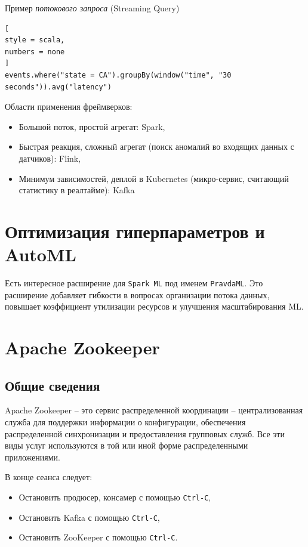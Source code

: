 \documentclass[%
	11pt,
	a4paper,
	utf8,
		]{article}
\begin{document}
Пример \emph{потокового запроса} (Streaming Query)
\begin{lstlisting}[
style = scala,
numbers = none	
]
events.where("state = CA").groupBy(window("time", "30 seconds")).avg("latency")
\end{lstlisting}

Области применения фреймверков:
\begin{itemize}
	\item Большой поток, простой агрегат: Spark,
	
	\item Быстрая реакция, сложный агрегат (поиск аномалий во входящих данных с датчиков): Flink,
	
	\item Минимум зависимостей, деплой в Kubernetes (микро-сервис, считающий статистику в реалтайме): Kafka
\end{itemize}


\section{Оптимизация гиперпараметров и AutoML}

Есть интересное расширение для \texttt{Spark ML} под именем \texttt{PravdaML}. Это расширение добавляет гибкости в вопросах организации потока данных, повышает коэффициент утилизации ресурсов и улучшения масштабирования ML.

\section{Apache Zookeeper}

\subsection{Общие сведения}

{Apache Zookeeper} -- это сервис распределенной координации -- централизованная служба для поддержки информации о конфигурации, обеспечения распределенной синхронизации и предоставления групповых служб. Все эти виды услуг используются в той или иной форме распределенными приложениями.

В конце сеанса следует:
\begin{itemize}
	\item Остановить продюсер, консамер с помощью \texttt{Ctrl-C},
	
	\item Остановить Kafka с помощью \texttt{Ctrl-C},
	
	\item Остановить ZooKeeper с помощью \texttt{Ctrl-C}.
\end{itemize}
\end{document}

